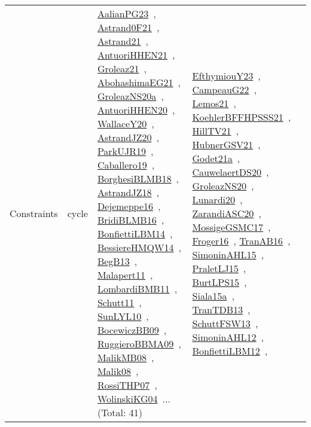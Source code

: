 {\begin{longtable}{lp{3cm}>{\raggedright\arraybackslash}p{6cm}>{\raggedright\arraybackslash}p{6cm}>{\raggedright\arraybackslash}p{8cm}}
Constraints & cycle & \href{works/AalianPG23.pdf}{AalianPG23}~\cite{AalianPG23}, \href{works/Astrand0F21.pdf}{Astrand0F21}~\cite{Astrand0F21}, \href{works/Astrand21.pdf}{Astrand21}~\cite{Astrand21}, \href{works/AntuoriHHEN21.pdf}{AntuoriHHEN21}~\cite{AntuoriHHEN21}, \href{works/Groleaz21.pdf}{Groleaz21}~\cite{Groleaz21}, \href{works/AbohashimaEG21.pdf}{AbohashimaEG21}~\cite{AbohashimaEG21}, \href{works/GroleazNS20a.pdf}{GroleazNS20a}~\cite{GroleazNS20a}, \href{works/AntuoriHHEN20.pdf}{AntuoriHHEN20}~\cite{AntuoriHHEN20}, \href{works/WallaceY20.pdf}{WallaceY20}~\cite{WallaceY20}, \href{works/AstrandJZ20.pdf}{AstrandJZ20}~\cite{AstrandJZ20}, \href{works/ParkUJR19.pdf}{ParkUJR19}~\cite{ParkUJR19}, \href{works/Caballero19.pdf}{Caballero19}~\cite{Caballero19}, \href{works/BorghesiBLMB18.pdf}{BorghesiBLMB18}~\cite{BorghesiBLMB18}, \href{works/AstrandJZ18.pdf}{AstrandJZ18}~\cite{AstrandJZ18}, \href{works/Dejemeppe16.pdf}{Dejemeppe16}~\cite{Dejemeppe16}, \href{works/BridiBLMB16.pdf}{BridiBLMB16}~\cite{BridiBLMB16}, \href{works/BonfiettiLBM14.pdf}{BonfiettiLBM14}~\cite{BonfiettiLBM14}, \href{works/BessiereHMQW14.pdf}{BessiereHMQW14}~\cite{BessiereHMQW14}, \href{works/BegB13.pdf}{BegB13}~\cite{BegB13}, \href{works/Malapert11.pdf}{Malapert11}~\cite{Malapert11}, \href{works/LombardiBMB11.pdf}{LombardiBMB11}~\cite{LombardiBMB11}, \href{works/Schutt11.pdf}{Schutt11}~\cite{Schutt11}, \href{works/SunLYL10.pdf}{SunLYL10}~\cite{SunLYL10}, \href{works/BocewiczBB09.pdf}{BocewiczBB09}~\cite{BocewiczBB09}, \href{works/RuggieroBBMA09.pdf}{RuggieroBBMA09}~\cite{RuggieroBBMA09}, \href{works/MalikMB08.pdf}{MalikMB08}~\cite{MalikMB08}, \href{works/Malik08.pdf}{Malik08}~\cite{Malik08}, \href{works/RossiTHP07.pdf}{RossiTHP07}~\cite{RossiTHP07}, \href{works/WolinskiKG04.pdf}{WolinskiKG04}~\cite{WolinskiKG04}... (Total: 41) & \href{works/EfthymiouY23.pdf}{EfthymiouY23}~\cite{EfthymiouY23}, \href{works/CampeauG22.pdf}{CampeauG22}~\cite{CampeauG22}, \href{works/Lemos21.pdf}{Lemos21}~\cite{Lemos21}, \href{works/KoehlerBFFHPSSS21.pdf}{KoehlerBFFHPSSS21}~\cite{KoehlerBFFHPSSS21}, \href{works/HillTV21.pdf}{HillTV21}~\cite{HillTV21}, \href{works/HubnerGSV21.pdf}{HubnerGSV21}~\cite{HubnerGSV21}, \href{works/Godet21a.pdf}{Godet21a}~\cite{Godet21a}, \href{works/CauwelaertDS20.pdf}{CauwelaertDS20}~\cite{CauwelaertDS20}, \href{works/GroleazNS20.pdf}{GroleazNS20}~\cite{GroleazNS20}, \href{works/Lunardi20.pdf}{Lunardi20}~\cite{Lunardi20}, \href{works/ZarandiASC20.pdf}{ZarandiASC20}~\cite{ZarandiASC20}, \href{works/MossigeGSMC17.pdf}{MossigeGSMC17}~\cite{MossigeGSMC17}, \href{works/Froger16.pdf}{Froger16}~\cite{Froger16}, \href{works/TranAB16.pdf}{TranAB16}~\cite{TranAB16}, \href{works/SimoninAHL15.pdf}{SimoninAHL15}~\cite{SimoninAHL15}, \href{works/PraletLJ15.pdf}{PraletLJ15}~\cite{PraletLJ15}, \href{works/BurtLPS15.pdf}{BurtLPS15}~\cite{BurtLPS15}, \href{works/Siala15a.pdf}{Siala15a}~\cite{Siala15a}, \href{works/TranTDB13.pdf}{TranTDB13}~\cite{TranTDB13}, \href{works/SchuttFSW13.pdf}{SchuttFSW13}~\cite{SchuttFSW13}, \href{works/SimoninAHL12.pdf}{SimoninAHL12}~\cite{SimoninAHL12}, \href{works/BonfiettiLBM12.pdf}{BonfiettiLBM12}~\cite{BonfiettiLBM12}, 
\end{longtable}}
